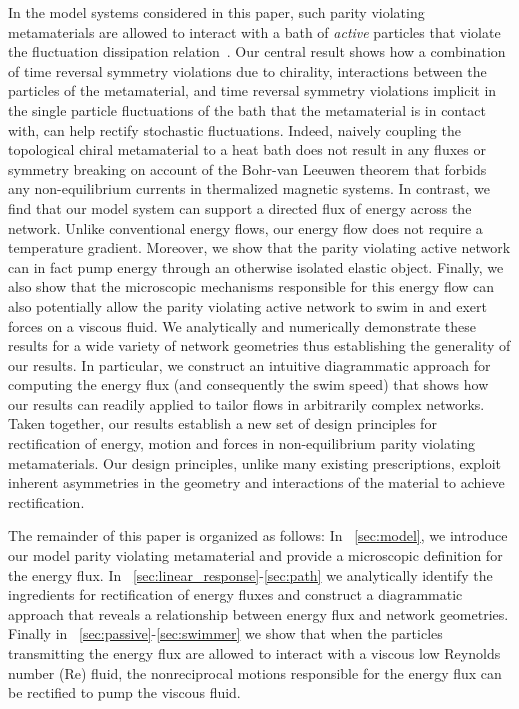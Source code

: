 \documentclass[
 preprint,
 preprintnumbers,
 amsmath,amssymb,
 aps,
 pre,
 longbibliography,
 superscriptaddress,
 10pt, twocolumn
]{revtex4-1}
\begin{document}
In the model systems considered in this paper, such parity violating metamaterials are allowed to interact with a bath of \textit{active} particles that violate the fluctuation dissipation relation~\cite{Fodor2016HowFar}. Our central result shows how a combination of time reversal symmetry violations due to chirality, interactions between the particles of the metamaterial, and time reversal symmetry violations implicit in the single particle fluctuations of the bath that the metamaterial is in contact with, can help rectify stochastic fluctuations. Indeed, naively coupling the topological chiral metamaterial to a heat bath does not result in any fluxes or symmetry breaking on account of the Bohr-van Leeuwen theorem \cite{Pradhan2010NonexistenceClassical} that forbids any non-equilibrium currents in thermalized magnetic systems. In contrast, we find that our model system can support a directed flux of energy across the network. Unlike conventional energy flows, our energy flow does not require a temperature gradient. Moreover, we show that the {parity violating active} network can in fact pump energy through an otherwise isolated elastic object. Finally, we also show that the microscopic mechanisms responsible for this energy flow can also potentially allow the {parity violating active} network to swim in and exert forces on a viscous fluid. We analytically and numerically demonstrate these results for a wide variety of network geometries thus establishing the generality of our results. In particular, we construct an intuitive diagrammatic approach for computing the energy flux (and consequently the swim speed) that shows how our results can readily applied to tailor flows in arbitrarily complex networks. Taken together, our results establish a new set of design principles for rectification of energy, motion and forces in non-equilibrium parity violating metamaterials. Our design principles, unlike many existing prescriptions, exploit inherent asymmetries in the geometry and interactions of the material to achieve rectification.

The remainder of this paper is organized as follows:
In \secname~\ref{sec:model}, we introduce our model parity violating metamaterial and provide a microscopic definition for the energy flux.
In \secname~\ref{sec:linear_response}-\ref{sec:path} we analytically identify the ingredients for rectification of energy fluxes and construct a diagrammatic approach that reveals a relationship between energy flux and network geometries.
Finally in \secname~\ref{sec:passive}-\ref{sec:swimmer} we show that when the particles transmitting the energy flux are allowed to interact with a viscous low Reynolds number (Re) fluid, the nonreciprocal motions responsible for the energy flux can be rectified to pump the viscous fluid. 
\end{document}
